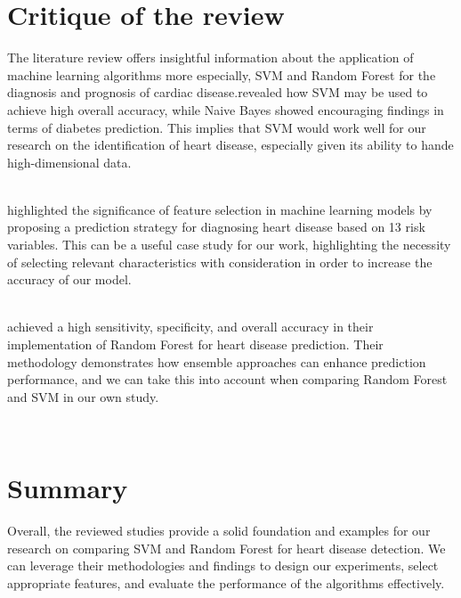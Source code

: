 \section{Critique of the review} %
The literature review offers insightful information about the application of machine learning algorithms more especially, SVM and Random Forest for the diagnosis and prognosis of cardiac disease.\cite{seema2016predictive}revealed how SVM may be used to achieve high overall accuracy, while Naive Bayes showed encouraging findings in terms of diabetes prediction. This implies that SVM would work well for our research on the identification of heart disease, especially given its ability to hande high-dimensional data.

 ~\\
\cite{shetty2016different}highlighted the significance of feature selection in machine learning models by proposing a prediction strategy for diagnosing heart disease based on 13 risk variables. This can be a useful case study for our work, highlighting the necessity of selecting relevant characteristics with consideration in order to increase the accuracy of our model.
~\\
\

\cite{pal2021prediction} achieved a high sensitivity, specificity, and overall accuracy in their implementation of Random Forest for heart disease prediction. Their methodology demonstrates how ensemble approaches can enhance prediction performance, and we can take this into account when comparing Random Forest and SVM in our own study.

\








\section{Summary} 
Overall, the reviewed studies provide a solid foundation and examples for our research on comparing SVM and Random Forest for heart disease detection. We can leverage their methodologies and findings to design our experiments, select appropriate features, and evaluate the performance of the algorithms effectively.